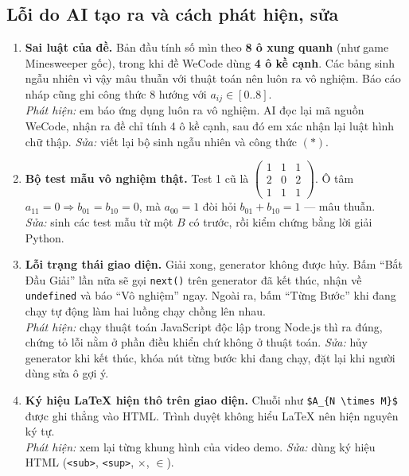 \documentclass[12pt,a4paper]{article}
\begin{document}
\subsection{Lỗi do AI tạo ra và cách phát hiện, sửa}
\begin{enumerate}
    \item \textbf{Sai luật của đề.} Bản đầu tính số mìn theo \textbf{8 ô xung quanh} (như game Minesweeper gốc), trong khi đề WeCode dùng \textbf{4 ô kề cạnh}. Các bảng sinh ngẫu nhiên vì vậy mâu thuẫn với thuật toán nên luôn ra vô nghiệm. Báo cáo nháp cũng ghi công thức 8 hướng với $a_{ij} \in [0..8]$. \\
    \textit{Phát hiện:} em báo ứng dụng luôn ra vô nghiệm. AI đọc lại mã nguồn WeCode, nhận ra đề chỉ tính 4 ô kề cạnh, sau đó em xác nhận lại luật hình chữ thập. \textit{Sửa:} viết lại bộ sinh ngẫu nhiên và công thức $(\ast)$.

    \item \textbf{Bộ test mẫu vô nghiệm thật.} Test 1 cũ là $\begin{pmatrix}1&1&1\\2&0&2\\1&1&1\end{pmatrix}$. Ô tâm $a_{11} = 0 \Rightarrow b_{01} = b_{10} = 0$, mà $a_{00} = 1$ đòi hỏi $b_{01} + b_{10} = 1$ --- mâu thuẫn. \\
    \textit{Sửa:} sinh các test mẫu từ một $B$ có trước, rồi kiểm chứng bằng lời giải Python.

    \item \textbf{Lỗi trạng thái giao diện.} Giải xong, generator không được hủy. Bấm ``Bắt Đầu Giải'' lần nữa sẽ gọi \texttt{next()} trên generator đã kết thúc, nhận về \texttt{undefined} và báo ``Vô nghiệm'' ngay. Ngoài ra, bấm ``Từng Bước'' khi đang chạy tự động làm hai luồng chạy chồng lên nhau. \\
    \textit{Phát hiện:} chạy thuật toán JavaScript độc lập trong Node.js thì ra đúng, chứng tỏ lỗi nằm ở phần điều khiển chứ không ở thuật toán. \textit{Sửa:} hủy generator khi kết thúc, khóa nút từng bước khi đang chạy, đặt lại khi người dùng sửa ô gợi ý.

    \item \textbf{Ký hiệu LaTeX hiện thô trên giao diện.} Chuỗi như \verb|$A_{N \times M}$| được ghi thẳng vào HTML. Trình duyệt không hiểu LaTeX nên hiện nguyên ký tự. \\
    \textit{Phát hiện:} xem lại từng khung hình của video demo. \textit{Sửa:} dùng ký hiệu HTML (\texttt{<sub>}, \texttt{<sup>}, $\times$, $\in$).
\end{enumerate}
\end{document}
